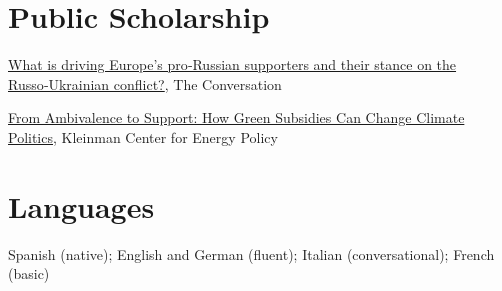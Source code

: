 \documentclass[11pt,a4paper]{article}
\newcommand{\dateditem}[2]{%
  \noindent
  \begin{minipage}[t]{0.80\linewidth}\vspace{0pt}\raggedright #1\end{minipage}\hfill%
  \begin{minipage}[t]{0.18\linewidth}\vspace{0pt}\raggedleft{\color{muted}#2}\end{minipage}\par
}
\newcommand{\simpleitem}[2]{%
  \dateditem{#1}{#2}\vspace{0.08em}
}
\begin{document}

\section{Public Scholarship}

\simpleitem{\href{https://theconversation.com/what-is-driving-europes-pro-russian-supporters-and-their-stance-on-the-russo-ukrainian-conflict-281598}{What is driving Europe's pro‑Russian supporters and their stance on the Russo‑Ukrainian conflict?}, The Conversation}{2026}
\simpleitem{\href{https://kleinmanenergy.upenn.edu/commentary/blog/insights-from-the-the-political-economy-of-climate-change-and-the-environment-2024-mini-conference/}{From Ambivalence to Support: How Green Subsidies Can Change Climate Politics}, Kleinman Center for Energy Policy}{2024}


\section{Languages}

Spanish (native); English and German (fluent); Italian (conversational); French (basic)
\end{document}
